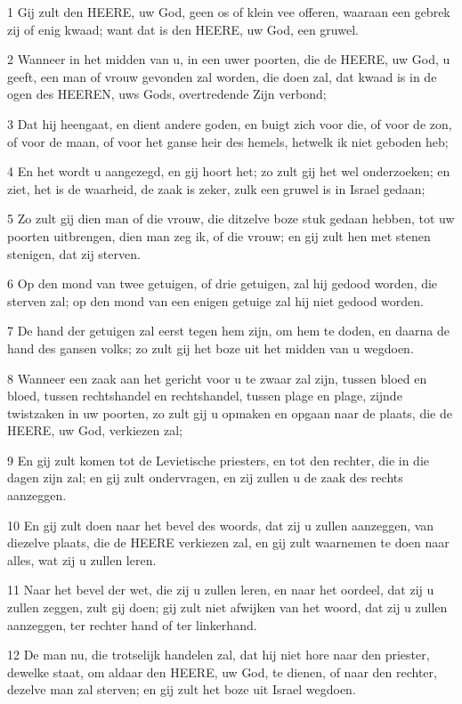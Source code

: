 \par 1 Gij zult den HEERE, uw God, geen os of klein vee offeren, waaraan een gebrek zij of enig kwaad; want dat is den HEERE, uw God, een gruwel.
\par 2 Wanneer in het midden van u, in een uwer poorten, die de HEERE, uw God, u geeft, een man of vrouw gevonden zal worden, die doen zal, dat kwaad is in de ogen des HEEREN, uws Gods, overtredende Zijn verbond;
\par 3 Dat hij heengaat, en dient andere goden, en buigt zich voor die, of voor de zon, of voor de maan, of voor het ganse heir des hemels, hetwelk ik niet geboden heb;
\par 4 En het wordt u aangezegd, en gij hoort het; zo zult gij het wel onderzoeken; en ziet, het is de waarheid, de zaak is zeker, zulk een gruwel is in Israel gedaan;
\par 5 Zo zult gij dien man of die vrouw, die ditzelve boze stuk gedaan hebben, tot uw poorten uitbrengen, dien man zeg ik, of die vrouw; en gij zult hen met stenen stenigen, dat zij sterven.
\par 6 Op den mond van twee getuigen, of drie getuigen, zal hij gedood worden, die sterven zal; op den mond van een enigen getuige zal hij niet gedood worden.
\par 7 De hand der getuigen zal eerst tegen hem zijn, om hem te doden, en daarna de hand des gansen volks; zo zult gij het boze uit het midden van u wegdoen.
\par 8 Wanneer een zaak aan het gericht voor u te zwaar zal zijn, tussen bloed en bloed, tussen rechtshandel en rechtshandel, tussen plage en plage, zijnde twistzaken in uw poorten, zo zult gij u opmaken en opgaan naar de plaats, die de HEERE, uw God, verkiezen zal;
\par 9 En gij zult komen tot de Levietische priesters, en tot den rechter, die in die dagen zijn zal; en gij zult ondervragen, en zij zullen u de zaak des rechts aanzeggen.
\par 10 En gij zult doen naar het bevel des woords, dat zij u zullen aanzeggen, van diezelve plaats, die de HEERE verkiezen zal, en gij zult waarnemen te doen naar alles, wat zij u zullen leren.
\par 11 Naar het bevel der wet, die zij u zullen leren, en naar het oordeel, dat zij u zullen zeggen, zult gij doen; gij zult niet afwijken van het woord, dat zij u zullen aanzeggen, ter rechter hand of ter linkerhand.
\par 12 De man nu, die trotselijk handelen zal, dat hij niet hore naar den priester, dewelke staat, om aldaar den HEERE, uw God, te dienen, of naar den rechter, dezelve man zal sterven; en gij zult het boze uit Israel wegdoen.
